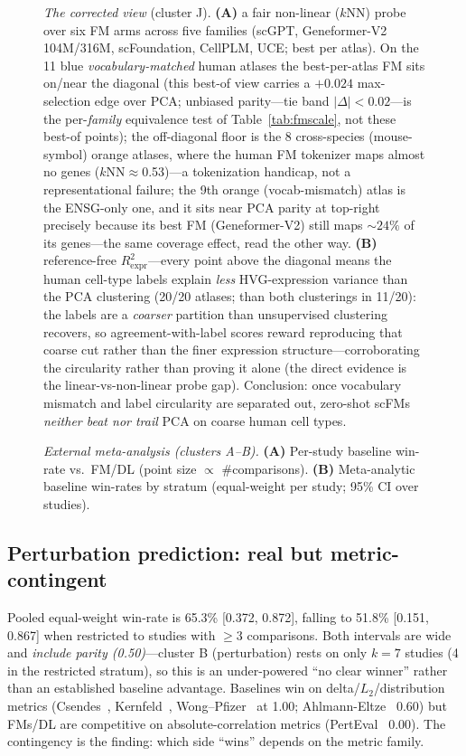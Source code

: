 \documentclass[11pt]{article}
\begin{document}
\begin{figure}[htb]\centering
\caption{\emph{The corrected view} (cluster J). \textbf{(A)} a fair non-linear ($k$NN) probe over six FM arms across five families (scGPT, Geneformer-V2 104M/316M, scFoundation, CellPLM, UCE; best per atlas). On the 11 blue \emph{vocabulary-matched} human atlases the best-per-atlas FM sits on/near the diagonal (this best-of view carries a $+0.024$ max-selection edge over PCA; unbiased parity---tie band $|\Delta|<0.02$---is the per-\emph{family} equivalence test of Table~\ref{tab:fmscale}, not these best-of points); the off-diagonal floor is the 8 cross-species (mouse-symbol) orange atlases, where the human FM tokenizer maps almost no genes ($k$NN${\approx}$0.53)---a tokenization handicap, not a representational failure; the 9th orange (vocab-mismatch) atlas is the ENSG-only one, and it sits near PCA parity at top-right precisely because its best FM (Geneformer-V2) still maps ${\sim}24\%$ of its genes---the same coverage effect, read the other way. \textbf{(B)} reference-free $R^2_{\mathrm{expr}}$---every point above the diagonal means the human cell-type labels explain \emph{less} HVG-expression variance than the PCA clustering (20/20 atlases; than both clusterings in 11/20): the labels are a \emph{coarser} partition than unsupervised clustering recovers, so agreement-with-label scores reward reproducing that coarse cut rather than the finer expression structure---corroborating the circularity rather than proving it alone (the direct evidence is the linear-vs-non-linear probe gap). Conclusion: once vocabulary mismatch and label circularity are separated out, zero-shot scFMs \emph{neither beat nor trail} PCA on coarse human cell types.}\label{fig:fair}\end{figure}

\begin{figure}[htb]\centering
\caption{\emph{External meta-analysis (clusters A--B).} \textbf{(A)} Per-study baseline win-rate vs.\ FM/DL (point size $\propto$ \#comparisons). \textbf{(B)} Meta-analytic baseline win-rates by stratum (equal-weight per study; 95\% CI over studies).}\label{fig:meta}\end{figure}

\subsection{Perturbation prediction: real but metric-contingent}
Pooled equal-weight win-rate is 65.3\% [0.372, 0.872], falling to 51.8\% [0.151, 0.867] when restricted to studies with $\geq$3 comparisons. Both intervals are wide and \emph{include parity (0.50)}---cluster B (perturbation) rests on only $k{=}7$ studies (4 in the restricted stratum), so this is an under-powered ``no clear winner'' rather than an established baseline advantage. Baselines win on delta/$L_2$/distribution metrics (Csendes~\cite{csendes2025}, Kernfeld~\cite{kernfeld2025}, Wong--Pfizer~\cite{wongpfizer2025} at 1.00; Ahlmann-Eltze~\cite{ahlmann2025} 0.60) but FMs/DL are competitive on absolute-correlation metrics (PertEval~\cite{perteval2024} 0.00). The contingency is the finding: which side ``wins'' depends on the metric family.
\end{document}
